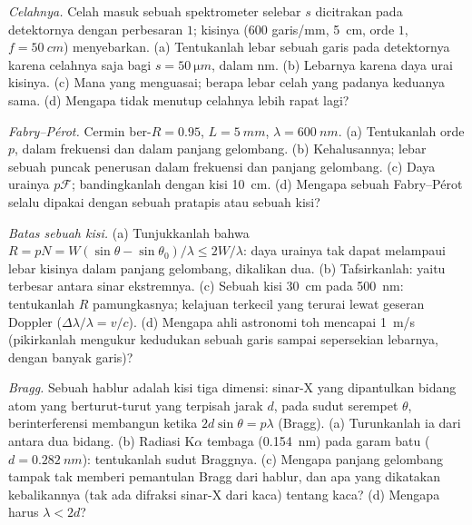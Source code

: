 \begin{exercise}[$\star\star$]\label{exo:b2:gratings:8}
\emph{Celahnya.} Celah masuk sebuah spektrometer selebar $s$ dicitrakan
pada detektornya dengan perbesaran $1$; kisinya ($600$ garis/mm,
\qty{5}{cm}, orde $1$, $f = \qty{50}{cm}$) menyebarkan. (a) Tentukanlah lebar sebuah garis pada
detektornya karena celahnya saja bagi $s = \qty{50}{\micro m}$, dalam nm. (b)
Lebarnya karena daya urai kisinya. (c) Mana yang menguasai; berapa lebar celah
yang padanya keduanya sama. (d) Mengapa tidak menutup celahnya lebih rapat lagi?
\end{exercise}

\begin{exercise}[$\star\star$]\label{exo:b2:gratings:9}
\emph{Fabry--Pérot.} Cermin ber-$R = 0.95$, $L = \qty{5}{mm}$, $\lambda = \qty{600}{nm}$.
(a) Tentukanlah orde $p$,  dalam frekuensi dan dalam panjang gelombang. (b)
Kehalusannya; lebar sebuah puncak penerusan dalam frekuensi dan panjang gelombang. (c)
Daya urainya $p\mathcal F$; bandingkanlah dengan kisi \qty{10}{cm}. (d) Mengapa
sebuah Fabry--Pérot selalu dipakai dengan sebuah pratapis atau sebuah kisi?
\end{exercise}

\begin{exercise}[$\star\star\star$]\label{exo:b2:gratings:10}
\emph{Batas sebuah kisi.} (a) Tunjukkanlah bahwa $R = pN = W(\sin\theta - \sin\theta_0)
/\lambda \le 2W/\lambda$: daya urainya tak dapat melampaui lebar
kisinya dalam panjang gelombang, dikalikan dua. (b) Tafsirkanlah: yaitu 
terbesar antara sinar ekstremnya. (c) Sebuah kisi \qty{30}{cm} pada
\qty{500}{nm}: tentukanlah $R$ pamungkasnya; kelajuan terkecil yang terurai lewat geseran Doppler
($\Delta\lambda/\lambda = v/c$). (d) Mengapa ahli astronomi toh mencapai \qty{1}{m/s}
(pikirkanlah mengukur kedudukan sebuah garis sampai sepersekian lebarnya,
dengan banyak garis)?
\end{exercise}

\begin{exercise}[$\star\star\star$]\label{exo:b2:gratings:11}
\emph{Bragg.} Sebuah hablur adalah kisi tiga dimensi: sinar-X yang
dipantulkan bidang atom yang berturut-turut yang terpisah jarak $d$, pada
sudut serempet $\theta$, berinterferensi membangun ketika $2d\sin\theta = p\lambda$
(Bragg). (a) Turunkanlah ia dari  antara dua bidang.
(b) Radiasi K$\alpha$ tembaga (\qty{0.154}{nm}) pada garam batu ($d = \qty{0.282}{nm}$):
tentukanlah sudut Braggnya. (c) Mengapa panjang gelombang tampak tak memberi pemantulan
Bragg dari hablur, dan apa yang dikatakan kebalikannya (tak ada difraksi
sinar-X dari kaca) tentang kaca? (d) Mengapa harus $\lambda < 2d$?
\end{exercise}

